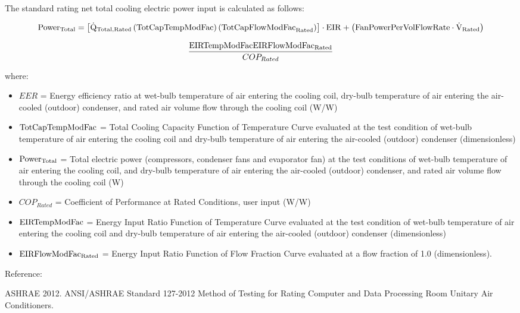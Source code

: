 The standard rating net total cooling electric power input is calculated as follows:

\begin{equation}
  \rm{Power}_{Total} = \left[ \dot{Q}_{Total,Rated} \left( \rm{TotCapTempModFac} \right) \left( \rm{TotCapFlowModFac}_{Rated} \right) \right] \cdot \rm{EIR} + \left( \rm{FanPowerPerVolFlowRate} \cdot \dot{V}_{Rated} \right)
\end{equation}

\begin{equation}
  \frac{\rm{EIRTempModFac} \rm{EIRFlowModFac_{Rated}}}{COP_{Rated}}
\end{equation}

where:

\begin{itemize}
\item
  \(EER\) = Energy efficiency ratio at wet-bulb temperature of air entering the cooling coil, dry-bulb temperature of air entering the air-cooled (outdoor) condenser, and rated air volume flow through the cooling coil (W/W)
\item
  \(\rm{TotCapTempModFac}\) = Total Cooling Capacity Function of Temperature Curve evaluated at the test condition of wet-bulb temperature of air entering the cooling coil and dry-bulb temperature of air entering the air-cooled (outdoor) condenser (dimensionless)
\item
  \(\rm{Power}_{Total}\) = Total electric power (compressors, condenser fans and evaporator fan) at the test conditions of wet-bulb temperature of air entering the cooling coil, and dry-bulb temperature of air entering the air-cooled (outdoor) condenser, and rated air volume flow through the cooling coil (W)
\item
  \(COP_{Rated}\) = Coefficient of Performance at Rated Conditions, user input (W/W)
\item
  \(\rm{EIRTempModFac}\) = Energy Input Ratio Function of Temperature Curve evaluated at the test condition of wet-bulb temperature of air entering the cooling coil and dry-bulb temperature of air entering the air-cooled (outdoor) condenser (dimensionless)
\item
  \(\rm{EIRFlowModFac}_{Rated}\) = Energy Input Ratio Function of Flow Fraction Curve evaluated at a flow fraction of 1.0 (dimensionless).
\end{itemize}

Reference:

ASHRAE 2012. ANSI/ASHRAE Standard 127-2012 Method of Testing for Rating Computer and Data Processing Room Unitary Air Conditioners.

